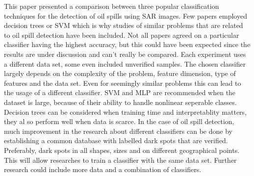 This paper presented a comparison between three popular classification techniques for the detection of oil spills using SAR images. Few papers employed decision trees or SVM which is why studies of similar problems that are related to oil spill detection have been included. Not all papers agreed on a particular classifier having the highest accuracy, but this could have been expected since the results are under discussion and can't really be compared. Each experiment uses a different data set, some even included unverified samples. The chosen classifier largely depends on the complexity of the problem, feature dimension, type of features and the data set. Even for seemingly similar problems this can lead to the usage of a different classifier. SVM and MLP are recommended when the dataset is large, because of their ability to handle nonlinear seperable classes. Decision trees can be considered when training time and interpretablity matters, they al so perform well when data is scarce. In the case of oil spill detection, much improvement in the research about different classifiers can be done by establishing a common database with labelled dark spots that are verified. Preferably, dark spots in all shapes, sizes and on different geographical points. This will allow researches to train a classifier with the same data set. Further research could include more data and a combination of classifiers.